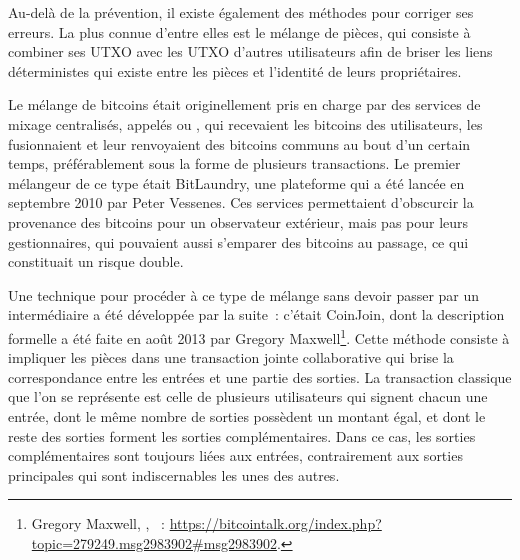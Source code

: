 Au-delà de la prévention, il existe également des méthodes pour corriger ses erreurs. La plus connue d'entre elles est le mélange de pièces, qui consiste à combiner ses UTXO avec les UTXO d'autres utilisateurs afin de briser les liens déterministes qui existe entre les pièces et l'identité de leurs propriétaires.

Le mélange de bitcoins était originellement pris en charge par des services de mixage centralisés, appelés  ou , qui recevaient les bitcoins des utilisateurs, les fusionnaient et leur renvoyaient des bitcoins communs au bout d'un certain temps, préférablement sous la forme de plusieurs transactions. Le premier mélangeur de ce type était BitLaundry, une plateforme qui a été lancée en septembre 2010 par Peter Vessenes. Ces services permettaient d'obscurcir la provenance des bitcoins pour un observateur extérieur, mais pas pour leurs gestionnaires, qui pouvaient aussi s'emparer des bitcoins au passage, ce qui constituait un risque double.  %

Une technique pour procéder à ce type de mélange sans devoir passer par un intermédiaire a été développée par la suite~: c'était CoinJoin, dont la description formelle a été faite en août 2013 par Gregory Maxwell\footnote{Gregory Maxwell, , ~: \url{https://bitcointalk.org/index.php?topic=279249.msg2983902\#msg2983902}.}. Cette méthode consiste à impliquer les pièces dans une transaction jointe collaborative qui brise la correspondance entre les entrées et une partie des sorties. La transaction classique que l'on se représente est celle de plusieurs utilisateurs qui signent chacun une entrée, dont le même nombre de sorties possèdent un montant égal, et dont le reste des sorties forment les sorties complémentaires. Dans ce cas, les sorties complémentaires sont toujours liées aux entrées, contrairement aux sorties principales qui sont indiscernables les unes des autres.

